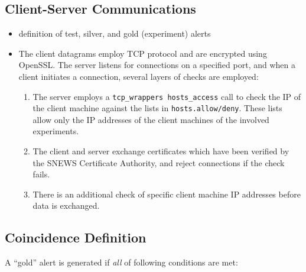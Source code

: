 \documentclass{article}
\begin{document}
\subsection{Client-Server Communications}
\begin{itemize}
\item definition of test, silver, and gold (experiment) alerts
\item The client datagrams employ TCP protocol and 
are encrypted using OpenSSL.  
The server listens for connections on a specified port,
and when a client initiates a connection, several layers
of checks are employed:
\begin{enumerate}
\item The server employs a \texttt{tcp\_wrappers hosts\_access}
call to check the IP of the client machine against the lists in
\texttt{hosts.allow/deny}.  These lists allow only the IP addresses
of the client machines of the involved experiments.
\item
The client and server exchange certificates which have been
verified by the SNEWS Certificate Authority, and reject
connections if the check fails.
\item There is an additional check of specific client machine
IP addresses before data is exchanged.
\end{enumerate}


\end{itemize}

\subsection{Coincidence Definition}

A ``gold'' alert is generated if \textit{all} of
following conditions are met:
\end{document}
